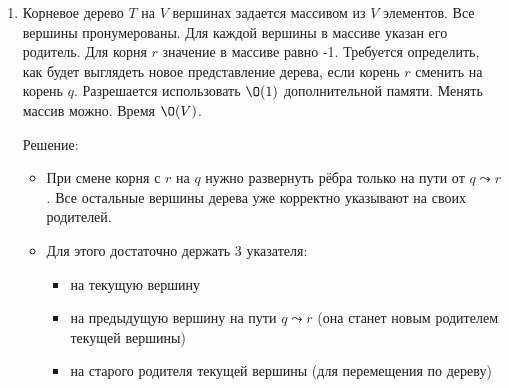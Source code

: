 \begin{enumerate}
\begin{itemize}
      \item Тогда для каждого ребра $(v, parent[v])$ количество простых путей вычисляется за $\O(1)$ по формуле $size[v] * (|V| - size[v])$, 
      где $v \neq r$ 

      \item Сложность по времени:
      \begin{itemize}
        \item DFS для подвешивания дерева и заполнения $parent[]$ -- $\O(|V| + |E|)$
        \item Заполнение массива $size[]$ -- $\O(|V|)$
        \item Подсчёт ответа для каждой вершины -- $\O(|V|)$
      \end{itemize}
      
      Итого: $\O(|V| + |E|) + \O(|V|) + \O(|V|) = \O(|V| + |E|)$. Так как в дереве $|E| = |V| - 1$, то итоговая сложность $\O(|V|)$

      \item Сложность по памяти:
      \begin{itemize}
        \item массив $parent[]$ -- $\O(|V|)$. Так как в условии ничего не сказано про способ хранения дерева, то считаем, что потребуется дополнительная память для подвешивания.
        \item массив $size[]$ -- $\O(|V|)$
      \end{itemize}

      Итого: $\O(|V|)$ 

    \end{itemize}

  \item
    Корневое дерево $T$ на $V$ вершинах задается массивом из $V$ элементов. 
    Все вершины пронумерованы. Для каждой вершины в массиве указан его родитель.
    Для корня $r$ значение в массиве равно -1. 
    Требуется определить, как будет выглядеть новое представление 
    дерева, если корень $r$ сменить на корень $q$. Разрешается использовать
    $\O(1)$ дополнительной памяти. Менять массив можно. Время $\O(V)$.

    Решение:

    \begin{itemize}
      \item При смене корня с $r$ на $q$ нужно развернуть рёбра только на пути от $q \leadsto r$.
      Все остальные вершины дерева уже корректно указывают на своих родителей.

      \item Для этого достаточно держать 3 указателя:
      \begin{itemize}
        \item на текущую вершину
        \item на предыдущую вершину на пути $q \leadsto r$ (она станет новым родителем текущей вершины)
        \item на старого родителя текущей вершины (для перемещения по дереву)
      \end{itemize}


\end{itemize}
\end{enumerate}
